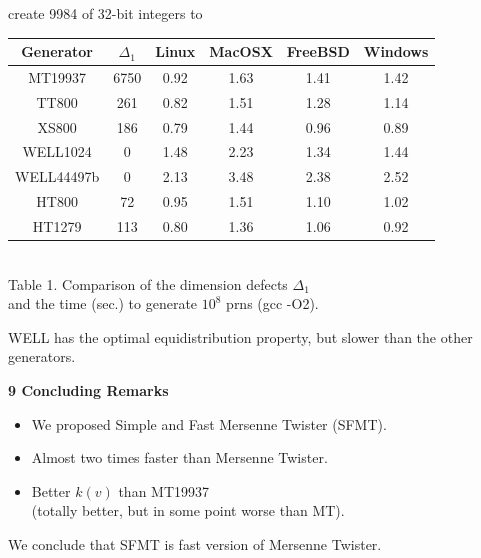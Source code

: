 \documentclass[a4j,12pt,landscape]{jarticle}
\begin{document}
create 9984 of 32-bit integers to 
\newpage
\begin{center}
\begin{tabular}{|c||c|c|c|c|c|}
\hline
{\Huge Generator}& {\Huge $\Delta_1$} 
  & {\Huge Linux} & {\Huge MacOSX} & {\Huge FreeBSD} & {\Huge Windows} \\ \hline \hline
{\Huge MT19937} & {\Huge 6750}
  & {\Huge 0.92} & {\Huge 1.63} & {\Huge 1.41} & {\Huge 1.42} \\ \hline
{\Huge TT800}  & {\Huge 261} 
  & {\Huge 0.82} & {\Huge 1.51} & {\Huge 1.28} & {\Huge 1.14} \\ \hline
{\Huge XS800} & {\Huge 186}
  & {\Huge 0.79} & {\Huge 1.44} & {\Huge 0.96} & {\Huge 0.89} \\ \hline
{\Huge WELL1024} & {\Huge 0}
  & {\Huge 1.48} & {\Huge 2.23} & {\Huge 1.34} & {\Huge 1.44} \\ \hline
{\Huge WELL44497b} & {\Huge 0}
  & {\Huge 2.13} & {\Huge 3.48} & {\Huge 2.38} & {\Huge 2.52} \\ \hline
{\Huge HT800} & {\Huge 72} 
  & {\Huge 0.95} & {\Huge 1.51} & {\Huge 1.10} & {\Huge 1.02} \\\hline
{\Huge HT1279} & {\Huge 113}
  & {\Huge 0.80} & {\Huge 1.36} & {\Huge 1.06} & {\Huge 0.92} \\ \hline
\end{tabular}
\\
\vskip 5mm
Table 1. Comparison of the dimension defects $\Delta_1$ 
\\
and the time (sec.) to generate $10^8$ prns (gcc -O2). 
\end{center}

WELL has the optimal equidistribution property, 
but slower than the other generators. 

\newpage
\noindent
{\bf 9 Concluding Remarks}
\begin{itemize}
\item We proposed Simple and Fast Mersenne Twister (SFMT). 
\item Almost two times faster than Mersenne Twister.
\item Better $k(v)$ than MT19937 \\
(totally better, but in some point worse than MT).
\end{itemize}
We conclude that SFMT is fast version of Mersenne Twister.
\end{document}
